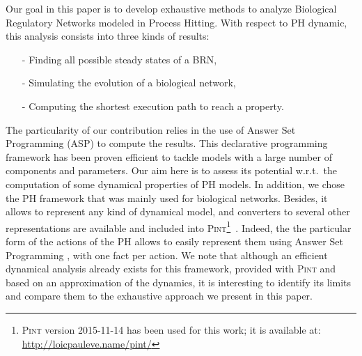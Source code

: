 Our goal in this paper is to develop exhaustive methods to analyze Biological Regulatory Networks modeled in Process Hitting. With respect to PH dynamic, this analysis consists into three kinds of results:
\begin{itemize}
\item[-] Finding all possible steady states of a BRN,
\item[-] Simulating the evolution of a biological network,
\item[-] Computing the shortest execution path to reach a property.
\end{itemize}

 The particularity of our contribution relies in the use of Answer Set Programming
(ASP) \cite{baral2003knowledge}
to compute the results.
This declarative programming framework has been proven efficient
to tackle models with a large number of components and parameters.
Our aim here is to assess its potential w.r.t.\ the computation
of some dynamical properties of PH models. In addition, we chose the PH framework that was mainly used for biological networks. Besides, it allows to represent any kind of dynamical model,
and converters to several other representations are available and included into \textsc{Pint}\footnote{\textsc{Pint} version 2015-11-14 has been used for this work; it is available at: \url{http://loicpauleve.name/pint/}}~\cite{PMR12-MSCS}.
Indeed, the the particular form of the actions of the PH allows
to easily represent them using Answer Set Programming \cite{Baral03, Vladimir, Glimpse, sureshkumar2006ansprolog},
with one fact per action.
We note that although an efficient dynamical analysis already exists for this framework,
provided with \textsc{Pint} and based on an approximation of the dynamics,
it is interesting to identify its limits
and compare them to the exhaustive approach we present in this paper.